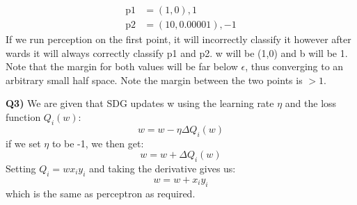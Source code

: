 \documentclass{article}
\begin{document}
\begin{titlepage}
\begin{align*} 
\text{p1} &= (1,0),1 \\
\text{p2} &= (10,0.00001),-1
\end{align*}
If we run perception on the first point, it will incorrectly classify it however after wards it will always correctly classify p1 and p2. w will be (1,0) and b will be 1. Note that the margin for both values will be far below $\epsilon$, thus converging to an arbitrary small half space. Note the margin between the two points is $> 1$.
\newpage

\textbf{Q3)} We are given that SDG updates w using the learning rate $\eta$ and the loss function $Q_i(w)$:
\[ w = w - \eta \Delta Q_i(w) \]
if we set $\eta$ to be -1, we then get:
\[ w = w + \Delta Q_i(w) \]
Setting $Q_i = wx_iy_i$ and taking the derivative gives us:
\[ w = w + x_iy_i \]
which is the same as perceptron as required.
\end{titlepage}
\end{document}
